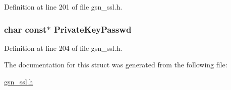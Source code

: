 Definition at line 201 of file gsn\_\-ssl.h.

\hypertarget{a00459_a733cc877fa0c06d5642460e0d2ad91f1}{
\subsubsection[{PrivateKeyPasswd}]{\setlength{\rightskip}{0pt plus 5cm}char const$\ast$ {\bf PrivateKeyPasswd}}}
\label{a00459_a733cc877fa0c06d5642460e0d2ad91f1}


Definition at line 204 of file gsn\_\-ssl.h.



The documentation for this struct was generated from the following file:\begin{DoxyCompactItemize}
\item 
\hyperlink{a00590}{gsn\_\-ssl.h}\end{DoxyCompactItemize}
